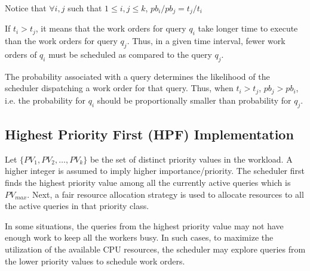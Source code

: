 Notice that $\forall i, j$ such that $1 \leq i, j \leq k$, 
$pb_{i}/pb_{j} = t_{j}/t_{i}$

If $t_{i} > t_{j}$, it means that the work orders for query $q_{i}$ take longer time to execute than the work orders for query $q_{j}$. 
Thus, in a given time interval, fewer work orders of $q_{i}$ must be scheduled as compared to the query $q_{j}$. %

The probability associated with a query determines the likelihood of the scheduler dispatching a work order for that query.
Thus, when $t_i > t_j$, $pb_j > pb_i$, i.e.  the probability for $q_{i}$ should be proportionally smaller than probability for $q_{j}$.

\subsection{Highest Priority First (HPF) Implementation}\label{ssec:hpf}
Let $\{PV_{1}, PV_{2}, \ldots, PV_{k}\}$ be the set of distinct priority values in the 
workload. 
A higher integer is assumed to imply higher importance/priority.
The scheduler first finds the highest priority value among all the currently active queries 
which is $PV_{max}$. %
Next, a fair resource allocation strategy is used to allocate resources to all the active queries in that priority class. 


In some situations, the queries from the highest priority value may not have enough work to keep all the workers busy. 
In such cases, to maximize the utilization of the available CPU resources, the 
scheduler may explore queries from the lower priority values to schedule work orders.
